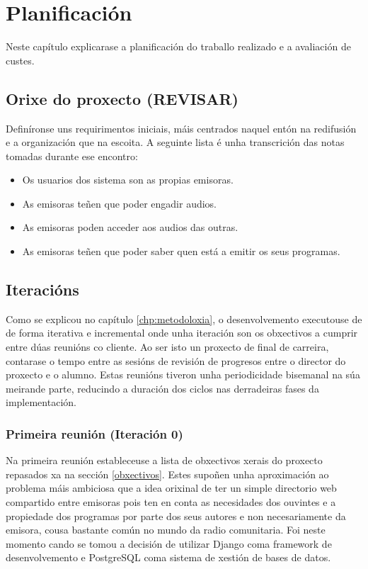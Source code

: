 \chapter[Planificación]{
  \label{chp:plan}
  Planificación
}
\minitoc
\newpage

Neste capítulo explicarase a planificación do traballo realizado e a avaliación de custes.  

\section{Orixe do proxecto (REVISAR)}

 Definíronse uns requirimentos iniciais, máis centrados naquel entón na redifusión e a organización que na escoita. A seguinte lista é unha transcrición das notas tomadas durante ese encontro:

\begin{itemize}
	\item Os usuarios dos sistema son as propias emisoras.
	\item As emisoras teñen que poder engadir audios.
	\item As emisoras poden acceder aos audios das outras.
	\item As emisoras teñen que poder saber quen está a emitir os seus programas.
\end{itemize}


\section{Iteracións}

Como se explicou no capítulo \ref{chp:metodoloxia}, o desenvolvemento executouse de  de forma iterativa e incremental onde unha iteración son os obxectivos a cumprir entre dúas reunións co cliente. Ao ser isto un proxecto de final de carreira, contarase o tempo entre as sesións de revisión de progresos entre o director do proxecto e o alumno. Estas reunións tiveron unha periodicidade bisemanal na súa meirande parte, reducindo a duración dos ciclos nas derradeiras fases da implementación.


\subsection{Primeira reunión (Iteración 0)}

Na primeira reunión estableceuse a lista de obxectivos xerais do proxecto repasados xa na sección \ref{obxectivos}. Estes supoñen unha aproximación ao problema máis ambiciosa que a idea orixinal de ter un simple directorio web compartido entre emisoras pois ten en conta as necesidades dos ouvintes e a propiedade dos programas por parte dos seus autores e non necesariamente da emisora, cousa bastante común no mundo da radio comunitaria. Foi neste momento cando se tomou a decisión de utilizar Django coma framework de desenvolvemento e PostgreSQL coma sistema de xestión de bases de datos.

